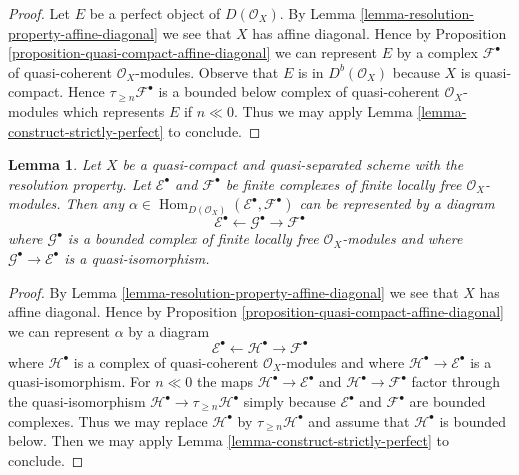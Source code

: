 \documentclass{stacks-project}
\theoremstyle{plain}
\newtheorem{lemma}[subsection]{Lemma}
\theoremstyle{definition}
\theoremstyle{remark}
\numberwithin{equation}{subsection}
\def\Hom{\mathop{\mathrm{Hom}}\nolimits}
\begin{document}
\begin{proof}
Let $E$ be a perfect object of $D(\mathcal{O}_X)$.
By Lemma \ref{lemma-resolution-property-affine-diagonal}
we see that $X$ has affine diagonal. Hence by
Proposition \ref{proposition-quasi-compact-affine-diagonal}
we can represent $E$ by a complex $\mathcal{F}^\bullet$
of quasi-coherent $\mathcal{O}_X$-modules.
Observe that $E$ is in $D^b(\mathcal{O}_X)$ because
$X$ is quasi-compact. Hence $\tau_{\geq n}\mathcal{F}^\bullet$
is a bounded below complex of quasi-coherent $\mathcal{O}_X$-modules
which represents $E$ if $n \ll 0$. Thus we may apply
Lemma \ref{lemma-construct-strictly-perfect} to conclude.
\end{proof}

\begin{lemma}
\label{lemma-resolution-property-map-perfect-complex}
Let $X$ be a quasi-compact and quasi-separated scheme with the
resolution property. Let $\mathcal{E}^\bullet$ and $\mathcal{F}^\bullet$
be finite complexes of finite locally free $\mathcal{O}_X$-modules.
Then any
$\alpha \in \Hom_{D(\mathcal{O}_X)}(\mathcal{E}^\bullet, \mathcal{F}^\bullet)$
can be represented by a diagram
$$
\mathcal{E}^\bullet \leftarrow \mathcal{G}^\bullet \to \mathcal{F}^\bullet
$$
where $\mathcal{G}^\bullet$ is a bounded complex of finite locally free
$\mathcal{O}_X$-modules and where $\mathcal{G}^\bullet \to \mathcal{E}^\bullet$
is a quasi-isomorphism.
\end{lemma}

\begin{proof}
By Lemma \ref{lemma-resolution-property-affine-diagonal}
we see that $X$ has affine diagonal. Hence by
Proposition \ref{proposition-quasi-compact-affine-diagonal}
we can represent $\alpha$ by a diagram
$$
\mathcal{E}^\bullet \leftarrow \mathcal{H}^\bullet \to \mathcal{F}^\bullet
$$
where $\mathcal{H}^\bullet$ is a complex of quasi-coherent
$\mathcal{O}_X$-modules and where
$\mathcal{H}^\bullet \to \mathcal{E}^\bullet$
is a quasi-isomorphism. For $n \ll 0$ the maps
$\mathcal{H}^\bullet \to \mathcal{E}^\bullet$ and
$\mathcal{H}^\bullet \to \mathcal{F}^\bullet$
factor through the quasi-isomorphism
$\mathcal{H}^\bullet \to \tau_{\geq n}\mathcal{H}^\bullet$
simply because $\mathcal{E}^\bullet$ and $\mathcal{F}^\bullet$
are bounded complexes. Thus we may replace $\mathcal{H}^\bullet$
by $\tau_{\geq n}\mathcal{H}^\bullet$ and assume that $\mathcal{H}^\bullet$
is bounded below.
Then we may apply
Lemma \ref{lemma-construct-strictly-perfect} to conclude.
\end{proof}
\end{document}
